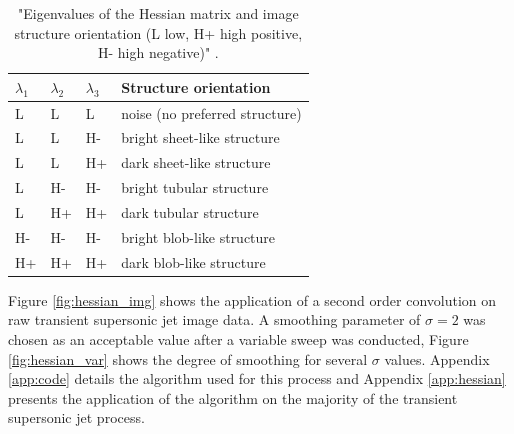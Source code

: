 \begin{table}[H]
\centering
\caption{"Eigenvalues of the Hessian matrix and image structure
orientation (L low, H+ high positive, H- high negative)" \citep{rudzki2009vessel}.}
\label{tab:hessian}
\begin{tabular}{@{}llll@{}}
\toprule
$\lambda_1$ & $\lambda_2$ & $\lambda_3$ & Structure orientation          \\ \midrule
L           & L           & L           & noise (no preferred structure) \\
L           & L           & H-          & bright sheet-like structure    \\
L           & L           & H+          & dark sheet-like structure      \\
L           & H-          & H-          & bright tubular structure       \\
L           & H+          & H+          & dark tubular structure         \\
H-          & H-          & H-          & bright blob-like structure     \\
H+          & H+          & H+          & dark blob-like structure       \\ \bottomrule
\end{tabular}
\end{table}

Figure \ref{fig:hessian_img} shows the application of a second order convolution on raw transient supersonic jet image data. A smoothing parameter of $\sigma=2$ was chosen as an acceptable value after a variable sweep was conducted, Figure \ref{fig:hessian_var} shows the degree of smoothing for several $\sigma$ values. Appendix \ref{app:code} details the algorithm used for this process and Appendix \ref{app:hessian} presents the application of the algorithm on the majority of the transient supersonic jet process.

